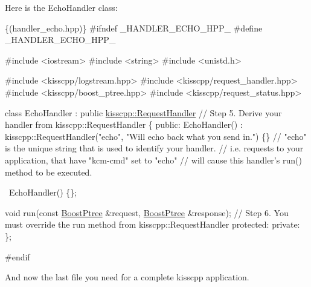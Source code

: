 Here is the Echo\-Handler class\-: 
\begin{DoxyCode}
\{(handler\_echo.hpp)\}
#ifndef \_HANDLER\_ECHO\_HPP\_
#define \_HANDLER\_ECHO\_HPP\_

#include <iostream>
#include <string>
#include <unistd.h>

#include <kisscpp/logstream.hpp>
#include <kisscpp/request\_handler.hpp>
#include <kisscpp/boost\_ptree.hpp>
#include <kisscpp/request\_status.hpp>

\textcolor{keyword}{class} EchoHandler : \textcolor{keyword}{public} \hyperlink{classkisscpp_1_1_request_handler}{kisscpp::RequestHandler}                           \textcolor{comment}{// Step
       5. Derive your handler from kisscpp::RequestHandler}
\{
  \textcolor{keyword}{public}:
    EchoHandler() :
      kisscpp::RequestHandler(\textcolor{stringliteral}{"echo"}, \textcolor{stringliteral}{"Will echo back what you send in."}) \{\} \textcolor{comment}{// "echo" is the unique string
       that is used to identify your handler.}
                                                                             \textcolor{comment}{// i.e. requests to your
       application, that have "kcm-cmd" set to "echo"}
                                                                             \textcolor{comment}{// will cause this handler's
       run() method to be executed.}

    ~EchoHandler() \{\};

    \textcolor{keywordtype}{void} run(\textcolor{keyword}{const} \hyperlink{boost__ptree_8hpp_ab36820650b8e0db36402aea80485633c}{BoostPtree} &request, \hyperlink{boost__ptree_8hpp_ab36820650b8e0db36402aea80485633c}{BoostPtree} &response);               \textcolor{comment}{// Step 6.
       You must override the run method from kisscpp::RequestHandler}
  \textcolor{keyword}{protected}:
  \textcolor{keyword}{private}:
\};

\textcolor{preprocessor}{#endif}
\end{DoxyCode}


And now the last file you need for a complete kisscpp application.



